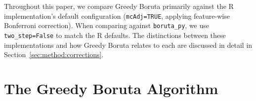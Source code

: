 \documentclass[runningheads]{llncs}
\newcommand{\addfigure}[1]{\todo[inline,color=green!20]{FIGURE: #1}}
\begin{document}


Throughout this paper, we compare Greedy Boruta primarily against the R implementation's default configuration (\texttt{mcAdj=TRUE}, applying feature-wise Bonferroni correction). When comparing against \texttt{boruta\_py}, we use \texttt{two\_step=False} to match the R defaults. The distinctions between these implementations and how Greedy Boruta relates to each are discussed in detail in Section~\ref{sec:method:corrections}.


\section{The Greedy Boruta Algorithm}
\label{sec:method}
\end{document}
